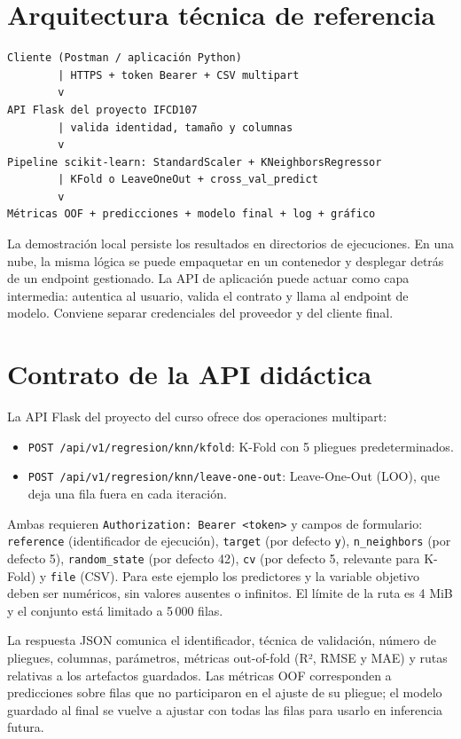 \documentclass[11pt,a4paper]{article}
\begin{document}
\section{Arquitectura técnica de referencia}
\begin{verbatim}
Cliente (Postman / aplicación Python)
        | HTTPS + token Bearer + CSV multipart
        v
API Flask del proyecto IFCD107
        | valida identidad, tamaño y columnas
        v
Pipeline scikit-learn: StandardScaler + KNeighborsRegressor
        | KFold o LeaveOneOut + cross_val_predict
        v
Métricas OOF + predicciones + modelo final + log + gráfico
\end{verbatim}
La demostración local persiste los resultados en directorios de ejecuciones. En una nube, la misma lógica se puede empaquetar en un contenedor y desplegar detrás de un endpoint gestionado. La API de aplicación puede actuar como capa intermedia: autentica al usuario, valida el contrato y llama al endpoint de modelo. Conviene separar credenciales del proveedor y del cliente final.

\section{Contrato de la API didáctica}
La API Flask del proyecto del curso ofrece dos operaciones multipart:
\begin{itemize}
  \item \texttt{POST /api/v1/regresion/knn/kfold}: K-Fold con 5 pliegues predeterminados.
  \item \texttt{POST /api/v1/regresion/knn/leave-one-out}: Leave-One-Out (LOO), que deja una fila fuera en cada iteración.
\end{itemize}
Ambas requieren \texttt{Authorization: Bearer <token>} y campos de formulario:
\texttt{reference} (identificador de ejecución), \texttt{target} (por defecto \texttt{y}), \texttt{n\_neighbors} (por defecto 5), \texttt{random\_state} (por defecto 42), \texttt{cv} (por defecto 5, relevante para K-Fold) y \texttt{file} (CSV). Para este ejemplo los predictores y la variable objetivo deben ser numéricos, sin valores ausentes o infinitos. El límite de la ruta es 4 MiB y el conjunto está limitado a 5\,000 filas.

La respuesta JSON comunica el identificador, técnica de validación, número de pliegues, columnas, parámetros, métricas out-of-fold (R², RMSE y MAE) y rutas relativas a los artefactos guardados. Las métricas OOF corresponden a predicciones sobre filas que no participaron en el ajuste de su pliegue; el modelo guardado al final se vuelve a ajustar con todas las filas para usarlo en inferencia futura.
\end{document}
